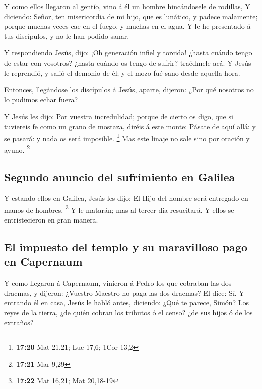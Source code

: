  Y como ellos llegaron al gentío, vino á él un hombre
hincándosele de rodillas,  Y diciendo: Señor, ten
misericordia de mi hijo, que es lunático, y padece malamente; porque
muchas veces cae en el fuego, y muchas en el agua.  Y le
he presentado á tus discípulos, y no le han podido sanar.

 Y respondiendo Jesús, dijo: ¡Oh generación infiel y
torcida! ¿hasta cuándo tengo de estar con vosotros? ¿hasta cuándo os
tengo de sufrir? traédmele acá.  Y Jesús le reprendió, y
salió el demonio de él; y el mozo fué sano desde aquella hora.

 Entonces, llegándose los discípulos á Jesús, aparte,
dijeron: ¿Por qué nosotros no lo pudimos echar fuera?

 Y Jesús les dijo: Por vuestra incredulidad; porque de
cierto os digo, que si tuviereis fe como un grano de mostaza, diréis á
este monte: Pásate de aquí allá: y se pasará: y nada os será imposible.
\footnote{\textbf{17:20} Mat 21,21; Luc 17,6; 1Cor 13,2} 
Mas este linaje no sale sino por oración y ayuno. \footnote{\textbf{17:21}
  Mar 9,29}

\hypertarget{segundo-anuncio-del-sufrimiento-en-galilea}{%
\subsection{Segundo anuncio del sufrimiento en
Galilea}\label{segundo-anuncio-del-sufrimiento-en-galilea}}

 Y estando ellos en Galilea, Jesús les dijo: El Hijo del
hombre será entregado en manos de hombres, \footnote{\textbf{17:22} Mat
  16,21; Mat 20,18-19}  Y le matarán; mas al tercer día
resucitará. Y ellos se entristecieron en gran manera.

\hypertarget{el-impuesto-del-templo-y-su-maravilloso-pago-en-capernaum}{%
\subsection{El impuesto del templo y su maravilloso pago en
Capernaum}\label{el-impuesto-del-templo-y-su-maravilloso-pago-en-capernaum}}

 Y como llegaron á Capernaum, vinieron á Pedro los que
cobraban las dos dracmas, y dijeron: ¿Vuestro Maestro no paga las dos
dracmas?  El dice: Sí. Y entrando él en casa, Jesús le
habló antes, diciendo: ¿Qué te parece, Simón? Los reyes de la tierra,
¿de quién cobran los tributos ó el censo? ¿de sus hijos ó de los
extraños?

